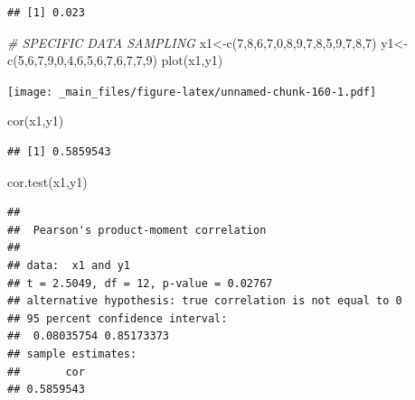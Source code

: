 \documentclass[
  notitlepage,
  onecolumn,
  openany]{book}
\newenvironment{Shaded}{\begin{snugshade}}{\end{snugshade}}
\newcommand{\CommentTok}[1]{\textcolor[rgb]{0.56,0.35,0.01}{\textit{#1}}}
\newcommand{\DecValTok}[1]{\textcolor[rgb]{0.00,0.00,0.81}{#1}}
\newcommand{\FunctionTok}[1]{\textcolor[rgb]{0.00,0.00,0.00}{#1}}
\newcommand{\NormalTok}[1]{#1}
\newcommand{\OtherTok}[1]{\textcolor[rgb]{0.56,0.35,0.01}{#1}}
\begin{document}
\begin{verbatim}
## [1] 0.023
\end{verbatim}

\begin{Shaded}
\begin{Highlighting}[]
\CommentTok{\# SPECIFIC DATA SAMPLING}
\NormalTok{x1}\OtherTok{\textless{}{-}}\FunctionTok{c}\NormalTok{(}\DecValTok{7}\NormalTok{,}\DecValTok{8}\NormalTok{,}\DecValTok{6}\NormalTok{,}\DecValTok{7}\NormalTok{,}\DecValTok{0}\NormalTok{,}\DecValTok{8}\NormalTok{,}\DecValTok{9}\NormalTok{,}\DecValTok{7}\NormalTok{,}\DecValTok{8}\NormalTok{,}\DecValTok{5}\NormalTok{,}\DecValTok{9}\NormalTok{,}\DecValTok{7}\NormalTok{,}\DecValTok{8}\NormalTok{,}\DecValTok{7}\NormalTok{)}
\NormalTok{y1}\OtherTok{\textless{}{-}}\FunctionTok{c}\NormalTok{(}\DecValTok{5}\NormalTok{,}\DecValTok{6}\NormalTok{,}\DecValTok{7}\NormalTok{,}\DecValTok{9}\NormalTok{,}\DecValTok{0}\NormalTok{,}\DecValTok{4}\NormalTok{,}\DecValTok{6}\NormalTok{,}\DecValTok{5}\NormalTok{,}\DecValTok{6}\NormalTok{,}\DecValTok{7}\NormalTok{,}\DecValTok{6}\NormalTok{,}\DecValTok{7}\NormalTok{,}\DecValTok{7}\NormalTok{,}\DecValTok{9}\NormalTok{)}
\FunctionTok{plot}\NormalTok{(x1,y1)}
\end{Highlighting}
\end{Shaded}

\texttt{[image: \_main\_files/figure-latex/unnamed-chunk-160-1.pdf]}

\begin{Shaded}
\begin{Highlighting}[]
\FunctionTok{cor}\NormalTok{(x1,y1)}
\end{Highlighting}
\end{Shaded}

\begin{verbatim}
## [1] 0.5859543
\end{verbatim}

\begin{Shaded}
\begin{Highlighting}[]
\FunctionTok{cor.test}\NormalTok{(x1,y1)}
\end{Highlighting}
\end{Shaded}

\begin{verbatim}
## 
##  Pearson's product-moment correlation
## 
## data:  x1 and y1
## t = 2.5049, df = 12, p-value = 0.02767
## alternative hypothesis: true correlation is not equal to 0
## 95 percent confidence interval:
##  0.08035754 0.85173373
## sample estimates:
##       cor 
## 0.5859543
\end{verbatim}
\end{document}
